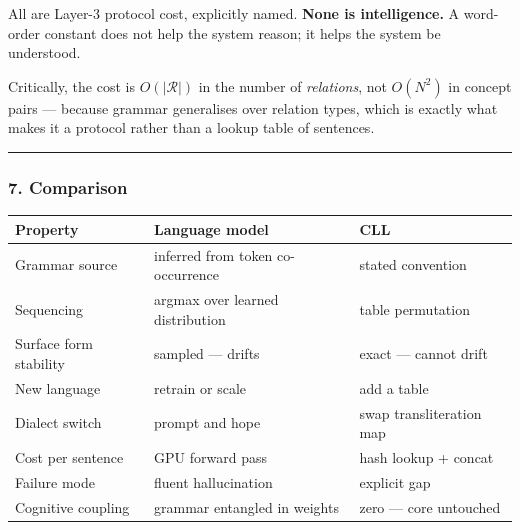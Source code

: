 \documentclass[
  11pt,
  a4paper,
]{article}
\begin{document}
All are Layer-3 protocol cost, explicitly named. \textbf{None is
intelligence.} A word-order constant does not help the system reason; it
helps the system be understood.

Critically, the cost is \(O(|\mathcal{R}|)\) in the number of
\emph{relations}, not \(O(N^2)\) in concept pairs --- because grammar
generalises over relation types, which is exactly what makes it a
protocol rather than a lookup table of sentences.

\begin{center}\rule{0.5\linewidth}{0.5pt}\end{center}

\subsubsection{7. Comparison}\label{comparison}

\begin{longtable}[]{@{}
  >{\raggedright\arraybackslash}p{}
  >{\raggedright\arraybackslash}p{}
  >{\raggedright\arraybackslash}p{}@{}}
\toprule\noalign{}
\begin{minipage}[b]{\linewidth}\raggedright
Property
\end{minipage} & \begin{minipage}[b]{\linewidth}\raggedright
Language model
\end{minipage} & \begin{minipage}[b]{\linewidth}\raggedright
CLL
\end{minipage} \\
\midrule\noalign{}
\endhead
\bottomrule\noalign{}
\endlastfoot
Grammar source & inferred from token co-occurrence & stated
convention \\
Sequencing & argmax over learned distribution & table permutation \\
Surface form stability & sampled --- drifts & exact --- cannot drift \\
New language & retrain or scale & add a table \\
Dialect switch & prompt and hope & swap transliteration map \\
Cost per sentence & GPU forward pass & hash lookup + concat \\
Failure mode & fluent hallucination & explicit gap \\
Cognitive coupling & grammar entangled in weights & zero --- core
untouched \\
\end{longtable}
\end{document}
